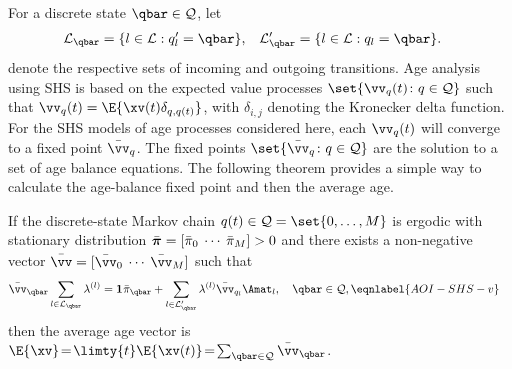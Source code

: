 \documentclass[conference, 10pt]{IEEEtran}
\newcommand{\Lcal}{\mathcal{L}}
\newcommand{\Qcal}{\mathcal{Q}}
\newcommand{\ql}{q_l}
\newcommand{\laml}[1][l]{\lambda^{(#1)}}
\newcommand{\rowvec}[1]{[\begin{matrix} #1\end{matrix}]}
\newcommand{\rvec}[1]{\smrvec{#1}}
\newcommand{\smrvec}[1]{\setlength\arraycolsep{2pt}\rowvec{#1}}
\newcommand{\piv}{\text{\boldmath{$\pi$}}}
\newcommand{\vvbar}{\bar{\vv}}
\newcommand{\onev}[1][n]{{\mathbf{1}}_{#1}}
\newcommand{\age}{\Delta}
\begin{document}
For a discrete state $\qbar \in \Qcal$, let %
\begin{align}
    \Lcal_{\qbar} &= \{l \in \Lcal : q'_l = \qbar \}, &
    \Lcal'_{\qbar} &= \{l \in \Lcal : q_l = \qbar \}.
\end{align}
denote the respective sets of incoming and outgoing transitions.
Age analysis using SHS is based on the  expected value processes $\set{\vv_q(t)\colon q\in \Qcal}$ such that 
 $\vv_q(t)%
 =\E{\xv(t)\delta_{q,q(t)}}$,
 with $\delta_{i,j}$ denoting the Kronecker delta function. For the SHS models of age processes considered here, each $\vv_q(t)$ will converge to a fixed point $\vvbar_q$. The fixed points $\set{\vvbar_q\colon q\in\Qcal}$ are the solution to a set of age balance equations. The following theorem provides a simple way to calculate the age-balance fixed point and then the average age. 
\begin{theorem}
\cite[Theorem~4]{yates2018ToIT}
If the discrete-state Markov chain $q(t)\in\Qcal=\set{0,\ldots,M}$ is ergodic with stationary distribution 
$\bar{\piv}=\rvec{\bar{\pi}_0 &\cdots &\bar{\pi}_M}>0$ and there exists a 
non-negative vector $\vvbar=\rvec{\vvbar_0&\cdots&\vvbar_M}$
such that 
\begin{align}
\bar{\vv}_{\qbar}\sum_{l\in\Lcal_{\qbar}}\laml &=\onev[]\bar{\pi}_{\qbar}+ \sum_{l\in\Lcal'_{\qbar}}\laml \bar{\vv}_{\ql}\Amat_l,\quad \qbar\in\Qcal,\eqnlabel{AOI-SHS-v}
\end{align}
then
the average age vector is 
$\E{\xv}\!=\!{\displaystyle \limty{t}}\E{\xv(t)}\!=\!
\sum_{\qbar\in\Qcal} \vvbar_{\qbar}$.
\end{theorem}
\end{document}
